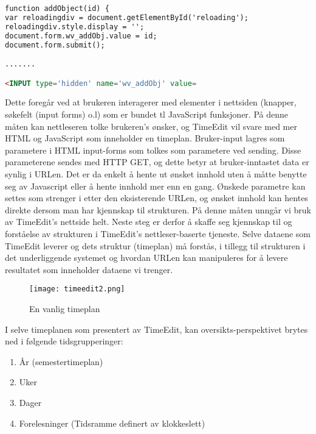 \documentclass[../main.tex]{subfiles}
\begin{document}
\begin{lstlisting}[language=HTML, frame=single, caption={Utdraget av HTML kildekoden til TimeEdit ovenfor viser en JavaScript-funksjon og en input-tag.}]
function addObject(id) {
var reloadingdiv = document.getElementById('reloading');
reloadingdiv.style.display = '';
document.form.wv_addObj.value = id;
document.form.submit();

.......

<INPUT type='hidden' name='wv_addObj' value=
\end{lstlisting}

Dette foregår ved at brukeren interagerer med elementer i nettsiden (knapper, søkefelt (input forms) o.l) som er bundet tl JavaScript funksjoner. På denne måten kan nettleseren tolke brukeren's ønsker, og TimeEdit vil svare med mer HTML og JavaScript som inneholder en timeplan. Bruker-input lagres som parametere i HTML input-forms som tolkes som parametere ved sending. Disse parameterene sendes med HTTP GET, og dette betyr at bruker-inntastet data er synlig i URLen. Det er da enkelt å hente ut ønsket innhold uten å måtte benytte seg av Javascript eller å hente innhold mer enn en gang. Ønskede parametre kan settes som strenger i etter den eksisterende URLen, og ønsket innhold kan hentes direkte dersom man har kjennskap til strukturen. På denne måten unngår vi bruk av TimeEdit's nettside helt. \newline
Neste steg er derfor å skaffe seg kjennskap til og forståelse av strukturen i TimeEdit's nettleser-baserte tjeneste. Selve dataene som TimeEdit leverer og dets struktur (timeplan) må forstås, i tillegg til strukturen i det underliggende systemet og hvordan URLen kan manipuleres for å levere resultatet som inneholder dataene vi trenger.

\begin{figure}[H]
  \centering
  \texttt{[image: timeedit2.png]}
  \caption{En vanlig timeplan}
\label{fig:timeeditc}
\end{figure}

I selve timeplanen som presentert av TimeEdit, kan oversikts-perspektivet brytes ned i følgende tidsgrupperinger:

\begin{enumerate}
\item År (semestertimeplan)
\item Uker
\item Dager
\item Forelesninger (Tidsramme definert av klokkeslett)
\end{enumerate}
\end{document}

